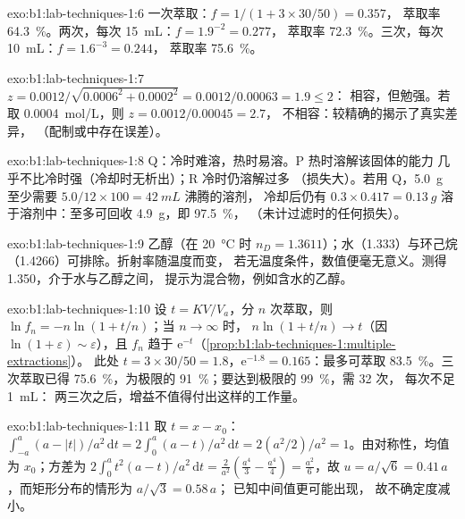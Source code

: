 \begin{solution}{exo:b1:lab-techniques-1:6}
一次萃取：$f = 1/(1 + 3 \times 30/50) = 0.357$，
萃取率 \qty{64.3}{\percent}。两次，每次 \qty{15}{mL}：$f = 1.9^{-2} = 0.277$，
萃取率 \qty{72.3}{\percent}。三次，每次 \qty{10}{mL}：$f = 1.6^{-3} = 0.244$，
萃取率 \qty{75.6}{\percent}。
\end{solution}

\begin{solution}{exo:b1:lab-techniques-1:7}
$z = 0.0012/\sqrt{0.0006^2 + 0.0002^2} = 0.0012/0.00063 = 1.9 \le 2$：
相容，但勉强。若取 \qty{0.0004}{mol/L}，则 $z = 0.0012/0.00045 = 2.7$，
不相容：较精确的揭示了真实差异，
（配制或中存在误差）。
\end{solution}

\begin{solution}{exo:b1:lab-techniques-1:8}
Q：冷时难溶，热时易溶。P 热时溶解该固体的能力
几乎不比冷时强（冷却时无析出）；R 冷时仍溶解过多
（损失大）。若用 Q，\qty{5.0}{g} 至少需要
$5.0/12 \times 100 = \qty{42}{mL}$ 沸腾的溶剂，
冷却后仍有 $0.3 \times 0.417 = \qty{0.13}{g}$ 溶于溶剂中：至多可回收
\qty{4.9}{g}，即 \qty{97.5}{\percent}，
（未计过滤时的任何损失）。
\end{solution}

\begin{solution}{exo:b1:lab-techniques-1:9}
乙醇（在 \qty{20}{\celsius} 时 $n_D = 1.3611$）；水（1.333）与环己烷
（1.4266）可排除。折射率随温度而变，
若无温度条件，数值便毫无意义。测得 1.350，介于水与乙醇之间，
提示为混合物，例如含水的乙醇。
\end{solution}

\begin{solution}{exo:b1:lab-techniques-1:10}
设 $t = KV/V_a$，分 $n$ 次萃取，则 $\ln f_n = -n\ln(1 + t/n)$；当 $n \to \infty$ 时，
$n \ln(1 + t/n) \to t$（因 $\ln(1 + \varepsilon) \sim
\varepsilon$），且 $f_n$ 趋于 $\mathrm{e}^{-t}$（\cref{prop:b1:lab-techniques-1:multiple-extractions}）。
此处 $t = 3 \times 30/50 = 1.8$，$\mathrm{e}^{-1.8} = 0.165$：最多可萃取
\qty{83.5}{\percent}。三次萃取已得 \qty{75.6}{\percent}，为极限的
\qty{91}{\percent}；要达到极限的 \qty{99}{\percent}，需 32 次，
每次不足 \qty{1}{mL}：
两三次之后，增益不值得付出这样的工作量。
\end{solution}

\begin{solution}{exo:b1:lab-techniques-1:11}
取 $t = x - x_0$：$\int_{-a}^{a} (a - |t|)/a^2 \,\mathrm{d}t =
2 \int_0^a (a - t)/a^2 \,\mathrm{d}t = 2 (a^2/2)/a^2 = 1$。由对称性，均值为
$x_0$；方差为 $2 \int_0^a t^2 (a - t)/a^2
\,\mathrm{d}t = \frac{2}{a^2}\left(\frac{a^4}{3} - \frac{a^4}{4}\right) =
\frac{a^2}{6}$，故 $u = a/\sqrt6 = 0.41\,a$，而矩形分布的情形为 $a/\sqrt3 = 0.58\,a$；
已知中间值更可能出现，
故不确定度减小。
\end{solution}

